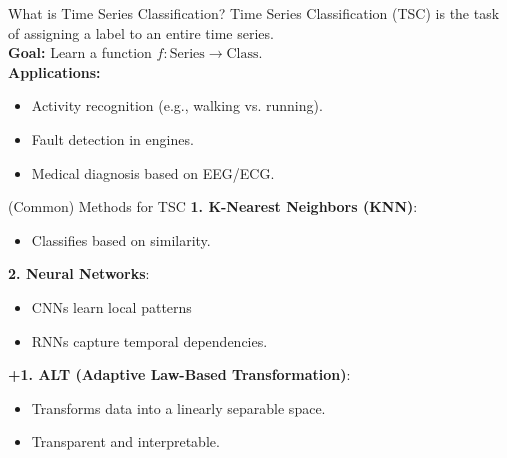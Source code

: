 \documentclass{beamer}
\begin{document}
\begin{frame}{What is Time Series Classification?}
  Time Series Classification (TSC) is the task of assigning a label to an entire time series.
  \\[1em]
  \textbf{Goal:} Learn a function \( f: \text{Series} \rightarrow \text{Class} \).
  \\[1em]
  \textbf{Applications:}
  \begin{itemize}
    \item Activity recognition (e.g., walking vs. running).
    \item Fault detection in engines.
    \item Medical diagnosis based on EEG/ECG.
  \end{itemize}
\end{frame}

\begin{frame}{(Common) Methods for TSC}
  \textbf{1. K-Nearest Neighbors (KNN)}:
  \begin{itemize}
    \item Classifies based on similarity.
  \end{itemize}
  \textbf{2. Neural Networks}:
  \begin{itemize}
    \item CNNs learn local patterns
    \item RNNs capture temporal dependencies.
  \end{itemize}
  \textbf{+1. ALT (Adaptive Law-Based Transformation)}\cite{kurbucz2025adaptive, halmos2025alt}:
  \begin{itemize}
    \item Transforms data into a linearly separable space.
    \item Transparent and interpretable.
  \end{itemize}
\end{frame}
\end{document}
